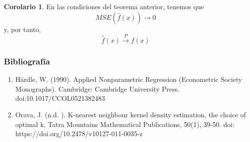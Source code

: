 \documentclass{beamer}
\theoremstyle{definition}
\newtheorem{coro}{Corolario}
\begin{document}
\begin{frame}
\begin{coro}
En las condiciones del teorema anterior, tenemos que
$$
MSE(\hat{f}(x))\to 0
$$
y, por tanto,
$$
\hat{f}(x)\overset{P}{\longrightarrow}f(x)
$$
\end{coro}
\end{frame}
\cite{Knearestneighbourkerneldensityestimationthechoiceofoptimalk}
\begin{frame}
\frametitle{Bibliografía}
\begin{enumerate}
\item Härdle, W. (1990). Applied Nonparametric Regression (Econometric Society Monographs). Cambridge: Cambridge University Press. doi:10.1017/CCOL0521382483
\item Orava, J. (n.d. ). K-nearest neighbour kernel density estimation, the choice of optimal k, Tatra Mountains Mathematical Publications, 50(1), 39-50. doi: https://doi.org/10.2478/v10127-011-0035-z
\end{enumerate}

\end{frame}
\end{document}
